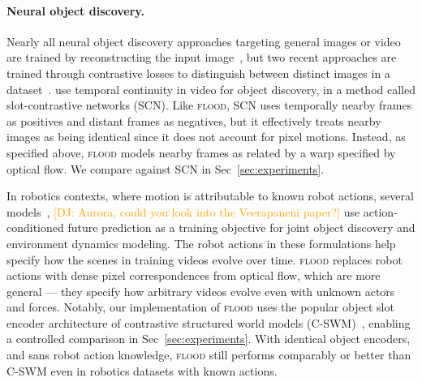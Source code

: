 \documentclass{article}
\newcommand{\jd}[1]{\textcolor{orange}{[DJ: #1]}}
\begin{document}


\paragraph{Neural object discovery.} Nearly all neural object discovery approaches targeting general images or video are trained by reconstructing the input image~\cite{jakab2018unsupervised,jakab2020self,greff2019multi, burgess2019monet,locatello2020object,Kulkarni2019UnsupervisedLO, minderer2019unsupervised, engelcke2019genesis}, but two recent approaches are trained through contrastive losses to distinguish between distinct images in a dataset~\cite{racah2020slot,lowe2020learning}. \citet{racah2020slot} use temporal continuity in video for object discovery, in a method called slot-contrastive networks (SCN). Like \textsc{flood}, SCN uses temporally nearby frames as positives and distant frames as negatives, but it effectively treats nearby images as being identical since it does not account for pixel motions. Instead, as specified above, \textsc{flood} models nearby frames as related by a warp specified by optical flow. We compare against SCN in Sec~\ref{sec:experiments}.  %

In robotics contexts, where motion is attributable to known robot actions, several models~\cite{kipf2019contrastive, kipf2018neural, Veerapaneni2019EntityAI}, \jd{Aurora, could you look into the Veerapaneni paper?} use action-conditioned future prediction as a training objective for joint object discovery and environment dynamics modeling. The robot actions in these formulations help specify how the scenes in training videos evolve over time. \textsc{flood} replaces robot actions with dense pixel correspondences from optical flow, which are more general --- they specify how arbitrary videos evolve even with unknown actors and forces. Notably, our implementation of \textsc{flood} uses the popular object slot encoder architecture of contrastive structured world models (C-SWM)~\cite{kipf2019contrastive}, enabling a controlled comparison in Sec~\ref{sec:experiments}. With identical object encoders, and sans robot action knowledge, \textsc{flood} still performs comparably or better than C-SWM even in robotics datasets with known actions.

\end{document}
